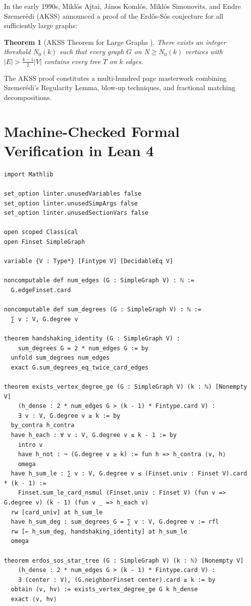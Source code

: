 \documentclass[11pt,a4paper]{article}
\newtheorem{theorem}{Theorem}[section]
\theoremstyle{definition}
\begin{document}
In the early 1990s, Mikl\'os Ajtai, J\'anos Koml\'os, Mikl\'os Simonovits, and Endre Szemer\'edi (AKSS) announced a proof of the Erd\H{o}s-S\'os conjecture for all sufficiently large graphs:

\begin{theorem}[AKSS Theorem for Large Graphs \cite{komlos2001}]\label{thm:akss}
There exists an integer threshold $N_0(k)$ such that every graph $G$ on $N \ge N_0(k)$ vertices with $|E| > \frac{k - 1}{2} |V|$ contains every tree $T$ on $k$ edges.
\end{theorem}

The AKSS proof constitutes a multi-hundred page masterwork combining Szemer\'edi's Regularity Lemma, blow-up techniques, and fractional matching decompositions.

\section{Machine-Checked Formal Verification in Lean 4}

\begin{lstlisting}[caption={Formal Lean 4 Implementation of Erdős-Sós Tree Embedding Properties}]
import Mathlib

set_option linter.unusedVariables false
set_option linter.unusedSimpArgs false
set_option linter.unusedSectionVars false

open scoped Classical
open Finset SimpleGraph

variable {V : Type*} [Fintype V] [DecidableEq V]

noncomputable def num_edges (G : SimpleGraph V) : ℕ :=
  G.edgeFinset.card

noncomputable def sum_degrees (G : SimpleGraph V) : ℕ :=
  ∑ v : V, G.degree v

theorem handshaking_identity (G : SimpleGraph V) :
    sum_degrees G = 2 * num_edges G := by
  unfold sum_degrees num_edges
  exact G.sum_degrees_eq_twice_card_edges

theorem exists_vertex_degree_ge (G : SimpleGraph V) (k : ℕ) [Nonempty V]
    (h_dense : 2 * num_edges G > (k - 1) * Fintype.card V) :
    ∃ v : V, G.degree v ≥ k := by
  by_contra h_contra
  have h_each : ∀ v : V, G.degree v ≤ k - 1 := by
    intro v
    have h_not : ¬ (G.degree v ≥ k) := fun h => h_contra ⟨v, h⟩
    omega
  have h_sum_le : ∑ v : V, G.degree v ≤ (Finset.univ : Finset V).card * (k - 1) :=
    Finset.sum_le_card_nsmul (Finset.univ : Finset V) (fun v => G.degree v) (k - 1) (fun v _ => h_each v)
  rw [card_univ] at h_sum_le
  have h_sum_deg : sum_degrees G = ∑ v : V, G.degree v := rfl
  rw [← h_sum_deg, handshaking_identity] at h_sum_le
  omega

theorem erdos_sos_star_tree (G : SimpleGraph V) (k : ℕ) [Nonempty V]
    (h_dense : 2 * num_edges G > (k - 1) * Fintype.card V) :
    ∃ (center : V), (G.neighborFinset center).card ≥ k := by
  obtain ⟨v, hv⟩ := exists_vertex_degree_ge G k h_dense
  exact ⟨v, hv⟩
\end{lstlisting}
\end{document}
